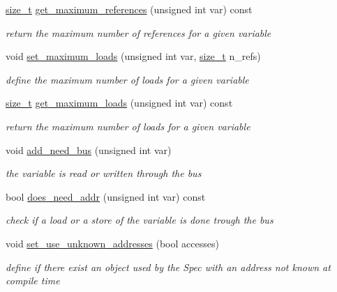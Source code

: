 \begin{DoxyCompactItemize}
\hyperlink{tutorial__fpt__2017_2intro_2sixth_2test_8c_a7c94ea6f8948649f8d181ae55911eeaf}{size\+\_\+t} \hyperlink{classmemory_a89891d351f4311540282f85f395160d4}{get\+\_\+maximum\+\_\+references} (unsigned int var) const
\begin{DoxyCompactList}\small\item\em return the maximum number of references for a given variable \end{DoxyCompactList}\item 
void \hyperlink{classmemory_a093f5c9909afd59a4ce3e480934fbfb4}{set\+\_\+maximum\+\_\+loads} (unsigned int var, \hyperlink{tutorial__fpt__2017_2intro_2sixth_2test_8c_a7c94ea6f8948649f8d181ae55911eeaf}{size\+\_\+t} n\+\_\+refs)
\begin{DoxyCompactList}\small\item\em define the maximum number of loads for a given variable \end{DoxyCompactList}\item 
\hyperlink{tutorial__fpt__2017_2intro_2sixth_2test_8c_a7c94ea6f8948649f8d181ae55911eeaf}{size\+\_\+t} \hyperlink{classmemory_af59fd8089c95addbd19c330aa1af978a}{get\+\_\+maximum\+\_\+loads} (unsigned int var) const
\begin{DoxyCompactList}\small\item\em return the maximum number of loads for a given variable \end{DoxyCompactList}\item 
void \hyperlink{classmemory_ab229af9483c5f4defbce43877652c365}{add\+\_\+need\+\_\+bus} (unsigned int var)
\begin{DoxyCompactList}\small\item\em the variable is read or written through the bus \end{DoxyCompactList}\item 
bool \hyperlink{classmemory_a6b6f8242a9b610f0a7942ee442e7a123}{does\+\_\+need\+\_\+addr} (unsigned int var) const
\begin{DoxyCompactList}\small\item\em check if a load or a store of the variable is done trough the bus \end{DoxyCompactList}\item 
void \hyperlink{classmemory_a0f7fcd0b927b352cb590638a3fb20bce}{set\+\_\+use\+\_\+unknown\+\_\+addresses} (bool accesses)
\begin{DoxyCompactList}\small\item\em define if there exist an object used by the Spec with an address not known at compile time \end{DoxyCompactList}\item 

\end{DoxyCompactItemize}
